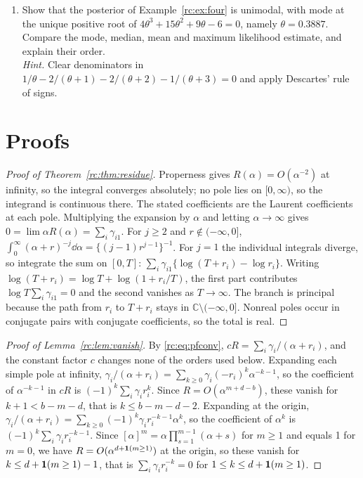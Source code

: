 \begin{enumerate}[label=\arabic*.,leftmargin=*,itemsep=4pt]
\item Show that the posterior of Example~\ref{rc:ex:four} is unimodal, with mode at the unique positive root of $4\theta^3+15\theta^2+9\theta-6=0$, namely $\theta=0.3887$. Compare the mode, median, mean and maximum likelihood estimate, and explain their order.\\
\emph{Hint.} Clear denominators in $1/\theta-2/(\theta+1)-2/(\theta+2)-1/(\theta+3)=0$ and apply Descartes' rule of signs.
\end{enumerate}

\section*{Proofs}\label{rc:app:proofs}

\begin{proof}[Proof of Theorem~\ref{rc:thm:residue}]
Properness gives $R(\alpha)=O(\alpha^{-2})$ at infinity, so the integral converges absolutely; no pole lies on $[0,\infty)$, so the integrand is continuous there. The stated coefficients are the Laurent coefficients at each pole. Multiplying the expansion by $\alpha$ and letting $\alpha\to\infty$ gives $0=\lim\alpha R(\alpha)=\sum_i\gamma_{i1}$. For $j\ge2$ and $r\notin(-\infty,0]$, $\int_0^\infty(\alpha+r)^{-j}\dd\alpha=\{(j-1)r^{j-1}\}^{-1}$. For $j=1$ the individual integrals diverge, so integrate the sum on $[0,T]$: $\sum_i\gamma_{i1}\{\log(T+r_i)-\log r_i\}$. Writing $\log(T+r_i)=\log T+\log(1+r_i/T)$, the first part contributes $\log T\sum_i\gamma_{i1}=0$ and the second vanishes as $T\to\infty$. The branch is principal because the path from $r_i$ to $T+r_i$ stays in $\mathbb{C}\setminus(-\infty,0]$. Nonreal poles occur in conjugate pairs with conjugate coefficients, so the total is real.
\end{proof}

\begin{proof}[Proof of Lemma~\ref{rc:lem:vanish}]
By \eqref{rc:eq:pfconv}, $cR=\sum_i\gamma_i/(\alpha+r_i)$, and the constant factor $c$ changes none of the orders used below. Expanding each simple pole at infinity, $\gamma_i/(\alpha+r_i)=\sum_{k\ge0}\gamma_i(-r_i)^k\alpha^{-k-1}$, so the coefficient of $\alpha^{-k-1}$ in $cR$ is $(-1)^k\sum_i\gamma_ir_i^k$. Since $R=O(\alpha^{m+d-b})$, these vanish for $k+1<b-m-d$, that is $k\le b-m-d-2$. Expanding at the origin, $\gamma_i/(\alpha+r_i)=\sum_{k\ge0}(-1)^k\gamma_ir_i^{-k-1}\alpha^k$, so the coefficient of $\alpha^k$ is $(-1)^k\sum_i\gamma_ir_i^{-k-1}$. Since $[\alpha]^m=\alpha\prod_{s=1}^{m-1}(\alpha+s)$ for $m\ge1$ and equals 1 for $m=0$, we have $R=O(\alpha^{d+\mathbf{1}(m\ge1)})$ at the origin, so these vanish for $k\le d+\mathbf{1}(m\ge1)-1$, that is $\sum_i\gamma_ir_i^{-k}=0$ for $1\le k\le d+\mathbf{1}(m\ge1)$.
\end{proof}

